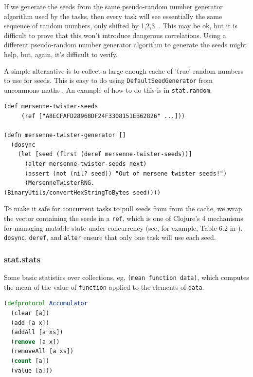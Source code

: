 \documentclass[11pt,openany,american,usenames,dvipsnames,svgnames,x11names,table,isodate]{article}
\numberwithin{equation}{section}
\numberwithin{figure}{section}
\begin{document}
If we generate the seeds from the same pseudo-random number generator
algorithm used by the tasks, then every task will see essentially
the same sequence of random numbers, only shifted by 1,2,3... This
may be ok, but it is difficult to prove that this won't introduce
dangerous correlations. Using a different pseudo-random number generator
algorithm to generate the seeds might help, but, again, it's difficult
to verify.

A simple alternative is to collect a large enough cache of 'true'
random numbers to use for seeds. This is easy to do using \texttt{DefaultSeedGenerator}
from uncommons-maths \cite{uncommons-maths-2012}. An example of how
to do this is in \texttt{stat.random}:

\begin{minipage}[t]{1\columnwidth}%
\begin{lstlisting}[caption={Independent random number generators},label={lis:independent-seeds}]
(def mersenne-twister-seeds 
     (ref ["A8ECFAFD28968DF24F3308151EB62826" ...]))

(defn mersenne-twister-generator [] 
  (dosync 
    (let [seed (first (deref mersenne-twister-seeds))] 
      (alter mersenne-twister-seeds next) 
      (assert (not (nil? seed)) "Out of mersene twister seeds!") 
      (MersenneTwisterRNG. 
(BinaryUtils/convertHexStringToBytes seed)))) 
\end{lstlisting}
%
\end{minipage}

To make it safe for concurrent tasks to pull seeds from from the cache,
we wrap the vector containing the seeds in a \texttt{ref}, which is
one of Clojure's 4 mechanisms for managing mutable state under concurrency
(see, for example, Table 6.2 in \cite{rathore2011clojure}). \texttt{dosync},
\texttt{deref}, and \texttt{alter} ensure that only one task will
use each seed.

\subsubsection{stat.stats}

Some basic statistics over collections, eg, \texttt{(mean~function~data)},
which computes the mean of the value of \texttt{function} applied
to the elements of \texttt{data}.

\begin{minipage}[t]{1\columnwidth}%
\begin{lstlisting}[caption={Updatable cost functions},label={lis:accumulator},language=clojure,tabsize=2]
(defprotocol Accumulator
  (clear [a])
  (add [a x])
  (addAll [a xs])
  (remove [a x])
  (removeAll [a xs])
  (count [a])
  (value [a])) 
\end{lstlisting}
%
\end{minipage}
\end{document}
